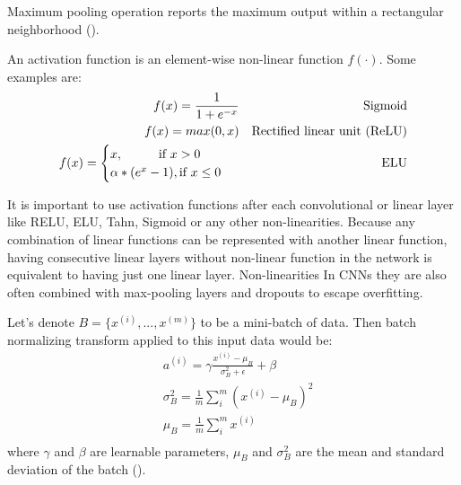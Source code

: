 \begin{definition}
	Maximum pooling operation reports the maximum output within a rectangular neighborhood (\cite{Goodfellow_2016}).
\end{definition}

\begin{definition}
	An activation function is an element-wise non-linear function $f(\cdot)$. Some examples are:
	\begin{align}             
		f(x) = \frac{1}{1 + e^{-x}} &&\text{Sigmoid} \\      
		f(x) = max(0, x) &&\text{Rectified linear unit (ReLU)}\\
		f(x) = \begin{cases}
				x, \hspace*{1cm} \textrm{if } x > 0 \\
				\alpha * (e^{x} - 1), \textrm{if }  x \leq 0
		  	\end{cases}\ &&\text{ELU}
		\end{align}
\end{definition}

It is important to use activation functions after each convolutional or linear layer like RELU, ELU, Tahn, Sigmoid or any other non-linearities. Because any combination of linear functions can be represented with another linear function, having consecutive linear layers without non-linear function in the network is equivalent to having just one linear layer. Non-linearities  In CNNs they are also often combined with max-pooling layers and dropouts to escape overfitting. 

\begin{definition}
	Let's denote $B = \{x^{(i)}, ..., x^{(m)}\}$ to be a mini-batch of data. Then batch normalizing transform applied to this input data would be:
	\begin{equation}
		\begin{split}
		& a^{(i)} = \gamma \frac{x^{(i)} - \mu_B}{\sigma^2_B + \epsilon} + \beta \\
		& \sigma^2_B = \frac{1}{m} \sum_i^m (x^{(i)} - \mu_B)^2 \\
		& \mu_B = \frac{1}{m} \sum_i^m x^{(i)} \\
		\end{split}
	\end{equation}
	where $\gamma$ and $\beta$ are learnable parameters, $\mu_B$ and $\sigma^2_B$ are the mean and standard deviation of the batch (\cite{Ioffe_2015}).
\end{definition}

